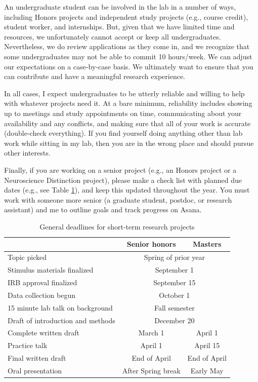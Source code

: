 \documentclass[letterpaper,11pt,oneside]{memoir}
\begin{document}
An undergraduate student can be involved in the lab in a number of ways, including Honors projects and independent study projects (e.g., course credit), student worker, and internships. But, given that we have limited time and resources, we unfortunately cannot accept or keep all undergraduates. Nevertheless, we do review applications as they come in, and we recognize that some undergraduates may not be able to commit 10 hours/week. We can adjust our expectations on a case-by-case basis. We ultimately want to ensure that you can contribute and have a meaningful research experience. 

In all cases, I expect undergraduates to be utterly reliable and willing to help with whatever projects need it. At a bare minimum, reliability includes showing up to meetings and study appointments on time, communicating about your availability and any conflicts, and making sure that all of your work is accurate (double-check everything). If you find yourself doing anything other than lab work while sitting in my lab, then you are in the wrong place and should pursue other interests.

Finally, if you are working on a senior project (e.g., an Honors project or a Neuroscience Distinction project), please make a check list with planned due dates (e.g., see Table \ref{table:deadlines}), and keep this updated throughout the year. You must work with someone more senior (a graduate student, postdoc, or research assistant) and me to outline goals and track progress on Asana.

\begin{table}
\centering
\caption{General deadlines for short-term research projects}
\begin{tabular}{lcc}
\toprule
& Senior honors & Masters\\
\midrule
Topic picked& \multicolumn{2}{c}{Spring of prior year}\\
Stimulus materials finalized& \multicolumn{2}{c}{September 1}\\
IRB approval finalized& \multicolumn{2}{c}{September 15}\\
Data collection begun& \multicolumn{2}{c}{October 1}\\
15 minute lab talk on background& \multicolumn{2}{c}{Fall semester}\\
Draft of introduction and methods& \multicolumn{2}{c}{December 20}\\
Complete written draft& March 1& April 1\\
Practice talk& April 1 & April 15\\
Final written draft& End of April & End of April\\
Oral presentation& After Spring break & Early May\\
\bottomrule
\end{tabular}
\label{table:deadlines}
\end{table}
\end{document}
